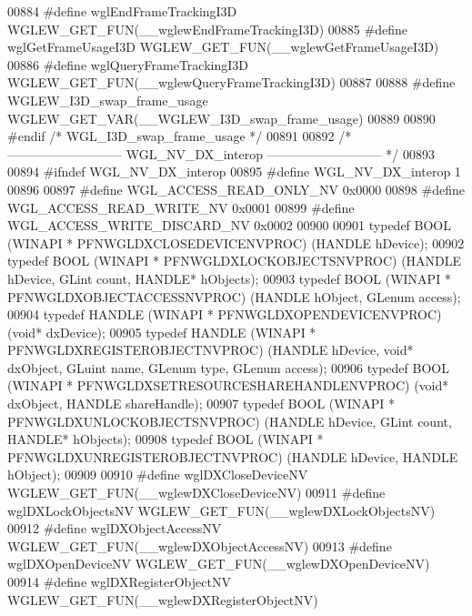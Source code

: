 \begin{DoxyCode}
00884 \textcolor{preprocessor}{#define wglEndFrameTrackingI3D WGLEW\_GET\_FUN(\_\_wglewEndFrameTrackingI3D)}
00885 \textcolor{preprocessor}{#define wglGetFrameUsageI3D WGLEW\_GET\_FUN(\_\_wglewGetFrameUsageI3D)}
00886 \textcolor{preprocessor}{#define wglQueryFrameTrackingI3D WGLEW\_GET\_FUN(\_\_wglewQueryFrameTrackingI3D)}
00887 
00888 \textcolor{preprocessor}{#define WGLEW\_I3D\_swap\_frame\_usage WGLEW\_GET\_VAR(\_\_WGLEW\_I3D\_swap\_frame\_usage)}
00889 
00890 \textcolor{preprocessor}{#endif }\textcolor{comment}{/* WGL\_I3D\_swap\_frame\_usage */}\textcolor{preprocessor}{}
00891 
00892 \textcolor{comment}{/* --------------------------- WGL\_NV\_DX\_interop --------------------------- */}
00893 
00894 \textcolor{preprocessor}{#ifndef WGL\_NV\_DX\_interop}
00895 \textcolor{preprocessor}{#define WGL\_NV\_DX\_interop 1}
00896 
00897 \textcolor{preprocessor}{#define WGL\_ACCESS\_READ\_ONLY\_NV 0x0000}
00898 \textcolor{preprocessor}{#define WGL\_ACCESS\_READ\_WRITE\_NV 0x0001}
00899 \textcolor{preprocessor}{#define WGL\_ACCESS\_WRITE\_DISCARD\_NV 0x0002}
00900 
00901 \textcolor{keyword}{typedef} BOOL (WINAPI * PFNWGLDXCLOSEDEVICENVPROC) (HANDLE hDevice);
00902 \textcolor{keyword}{typedef} BOOL (WINAPI * PFNWGLDXLOCKOBJECTSNVPROC) (HANDLE hDevice, GLint count, 
      HANDLE* hObjects);
00903 \textcolor{keyword}{typedef} BOOL (WINAPI * PFNWGLDXOBJECTACCESSNVPROC) (HANDLE hObject, GLenum 
      access);
00904 \textcolor{keyword}{typedef} HANDLE (WINAPI * PFNWGLDXOPENDEVICENVPROC) (\textcolor{keywordtype}{void}* dxDevice);
00905 \textcolor{keyword}{typedef} HANDLE (WINAPI * PFNWGLDXREGISTEROBJECTNVPROC) (HANDLE hDevice, \textcolor{keywordtype}{void}* 
      dxObject, GLuint name, GLenum type, GLenum access);
00906 \textcolor{keyword}{typedef} BOOL (WINAPI * PFNWGLDXSETRESOURCESHAREHANDLENVPROC) (\textcolor{keywordtype}{void}* dxObject, 
      HANDLE shareHandle);
00907 \textcolor{keyword}{typedef} BOOL (WINAPI * PFNWGLDXUNLOCKOBJECTSNVPROC) (HANDLE hDevice, GLint count, 
      HANDLE* hObjects);
00908 \textcolor{keyword}{typedef} BOOL (WINAPI * PFNWGLDXUNREGISTEROBJECTNVPROC) (HANDLE hDevice, HANDLE 
      hObject);
00909 
00910 \textcolor{preprocessor}{#define wglDXCloseDeviceNV WGLEW\_GET\_FUN(\_\_wglewDXCloseDeviceNV)}
00911 \textcolor{preprocessor}{#define wglDXLockObjectsNV WGLEW\_GET\_FUN(\_\_wglewDXLockObjectsNV)}
00912 \textcolor{preprocessor}{#define wglDXObjectAccessNV WGLEW\_GET\_FUN(\_\_wglewDXObjectAccessNV)}
00913 \textcolor{preprocessor}{#define wglDXOpenDeviceNV WGLEW\_GET\_FUN(\_\_wglewDXOpenDeviceNV)}
00914 \textcolor{preprocessor}{#define wglDXRegisterObjectNV WGLEW\_GET\_FUN(\_\_wglewDXRegisterObjectNV)}

\end{DoxyCode}
